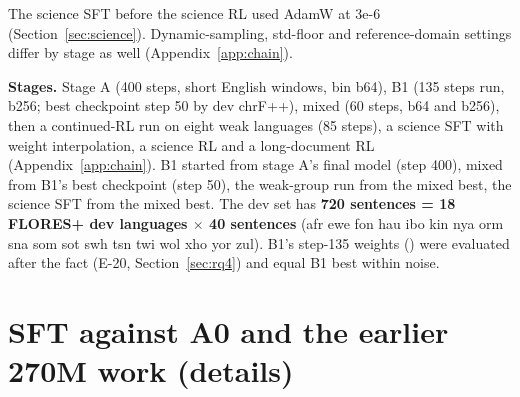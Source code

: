 The science SFT before the science RL used AdamW at 3e-6 (Section~\ref{sec:science}). Dynamic-sampling, std-floor and reference-domain settings differ by stage as well (Appendix~\ref{app:chain}). 

\textbf{Stages.} Stage A (400 steps, short English windows, bin b64), B1 (135 steps run, b256; best checkpoint step 50 by dev chrF++), mixed (60 steps, b64 and b256), then a continued-RL run on eight weak languages (85 steps), a science SFT with weight interpolation, a science RL and a long-document RL (Appendix~\ref{app:chain}). B1 started from stage A's final model (step 400), mixed from B1's best checkpoint (step 50), the weak-group run from the mixed best, the science SFT from the mixed best. The dev set has \textbf{720 sentences = 18 FLORES+ dev languages $\times$ 40 sentences} (afr ewe fon hau ibo kin nya orm sna som sot swh tsn twi wol xho yor zul). B1's step-135 weights () were evaluated after the fact (E-20, Section~\ref{sec:rq4}) and equal B1 best within noise. 

\section{SFT against A0 and the earlier 270M work (details)}\label{app:sft}

